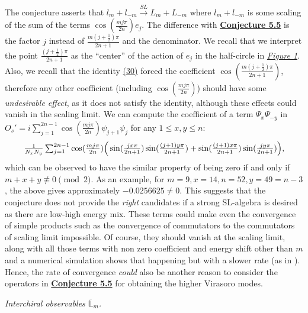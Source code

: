 \documentclass[twoside,11pt,titlepage]{amsart}
\renewcommand{\=}[1]{\stackrel{#1}{=}} %
\theoremstyle{definition}
\theoremstyle{remark}
\begin{document}
The conjecture \cite[(7.5)]{koo1994representations} asserts that $l_m+l_{-m} \xrightarrow{SL} L_m+L_{-m}$ where  $l_m+l_{-m}$ is some scaling of the sum of the terms $\cos(\frac{mj\pi}{2n})e_j$. The difference with \hyperref[cnj5.5]{\textbf{Conjecture 5.5}} is the factor $j$ instead of $\frac{m(j+\frac{1}{2})\pi}{2n+1}$ and the denominator. We recall that we interpret the point $\frac{(j+\frac{1}{2})\pi}{2n+1}$ as the ``center'' of the action of $e_j$ in the half-circle in \hyperref[fig1]{\textit{Figure 1}}. Also, we recall that the identity \hyperref[eq30]{(30)} forced the coefficient $\cos(\frac{m(j+\frac{1}{2})\pi}{2n+1})$, therefore any other coefficient (including $\cos(\frac{mj\pi}{2n})$) should have some \textit{undesirable effect}, as it does not satisfy the identity, although these effects could vanish in the scaling limit.  We can compute the coefficient of a term $\Psi_x\Psi_{-y}$ in $O_s'=i\sum_{j=1}^{2n-1} \cos(\frac{mj\pi}{2n})\psi_{j+1}\psi_j$ for any $1 \le x,y\le n$:
\begin{gather*}
\scalebox{0.999}{$\frac{1}{N_xN_y}\sum_{j=1}^{2n-1} \cos(\frac{mj\pi}{2n})\Big( \sin(\frac{jx\pi}{2n+1})\sin(\frac{(j+1)y\pi}{2n+1})+\sin(\frac{(j+1)x\pi}{2n+1})\sin(\frac{jy\pi}{2n+1})\Big ),$}
\end{gather*}
which can be observed to have the similar property of being zero if and only if $m+x+y \not \equiv 0 \pmod{2}$. As an example, for $m=9,x=14,n=52,y=49=n-3$, the above gives approximately $-0.0256625\neq 0$. This suggests that the conjecture \cite[(7.5)]{koo1994representations} does not provide the \textit{right} candidates if a strong SL-algebra is desired as there are low-high energy mix. These terms could make even the convergence of simple products such as the convergence of commutators to the commutators of scaling limit impossible. Of course, they should vanish at the scaling limit, along with all those terms with non zero coefficient and energy shift other than $m$ and a numerical simulation shows that happening but with a slower rate (as in \cite[table 19]{koo1994representations}). Hence, the rate of convergence \textit{could} also be another reason to consider the operators in  \hyperref[cnj5.5]{\textbf{Conjecture 5.5}} for obtaining the higher Virasoro modes.
\hfill \break

\textit{Interchiral observables $\overline{\mathbb{L}}_m$.}
\end{document}
